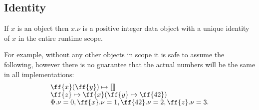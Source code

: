 \subsection{Identity}

\begin{definition}\label{def:constant}
If \(x\) is an object then \(x.\nu\) is a positive integer data object
with a unique identity of \(x\) in the entire runtime scope.
\end{definition}

For example, without any other objects in scope it is safe
to assume the following, however there is no guarantee that
the actual numbers will be the same in all implementations:
\begin{equation}
\begin{split}
& \ff{x}(\ff{y}) \mapsto \llbracket \rrbracket \br
& \ff{z} \mapsto \ff{x} ( \ff{y} \mapsto \ff{42} ) \br
& \Phi.\nu = 0, \ff{x}.\nu = 1, \ff{42}.\nu = 2, \ff{z}.\nu = 3.
\end{split}
\end{equation}

